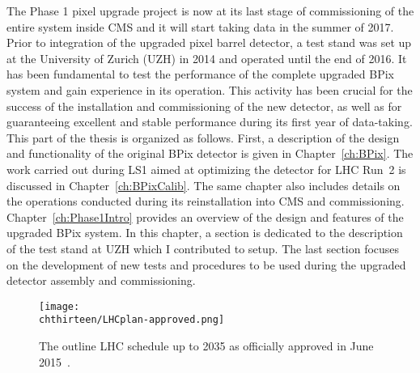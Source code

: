 The Phase 1 pixel upgrade project is now at its last stage of commissioning of the entire system inside CMS and it will start taking data in the summer of 2017.
Prior to integration of the upgraded pixel barrel detector, a test stand was set up at the University of Zurich (UZH) in 2014 and operated until the end of 2016. It has been fundamental to test the performance of the complete upgraded BPix system and gain experience in its operation. This activity has been crucial for the success of the installation and commissioning of the new detector, as well as for guaranteeing excellent and stable performance during its first year of data-taking.\\

This part of the thesis is organized as follows.
First, a description of the design and functionality of the original BPix detector is given in Chapter~\ref{ch:BPix}.
The work carried out during LS1 aimed at optimizing the detector for LHC Run~2 is discussed in Chapter~\ref{ch:BPixCalib}.
The same chapter also includes details on the operations conducted during its reinstallation into CMS and commissioning.
Chapter~\ref{ch:Phase1Intro} provides an overview of the design and features of the upgraded BPix system.
In this chapter, a section is dedicated to the description of the test stand at UZH which I contributed to setup.
The last section focuses on the development of new tests and procedures to be used during the upgraded detector assembly and commissioning.

\begin{figure}[!t]
 \begin{center}
 \texttt{[image: \\chthirteen/LHCplan-approved.png]}
 \end{center}
 \caption{The outline LHC schedule up to 2035 as officially approved in June 2015~\cite{LHCpage}.}
 \label{fig:LHCplan}
\end{figure}